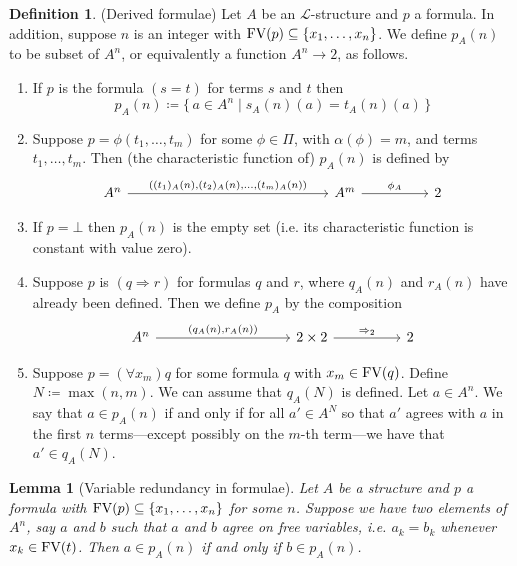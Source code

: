 \documentclass{report}
\theoremstyle{definition}
\theoremstyle{plain}
\newtheorem{lem}[thm]{Lemma}
\theoremstyle{definition}
\newtheorem{defn}[thm]{Definition}
\begin{document}
	\begin{defn}(Derived formulae)
		Let $A$ be an $\mathcal{L}$-structure and $p$ a formula. In addition, suppose $n$ is an integer with $\textnormal{FV}(p) \subseteq \{x_1,\ldots,x_n\}$. We define $p_A(n)$ to be subset of $A^{n}$, or equivalently a function $A^{n} \to 2$, as follows.
		\begin{enumerate}
			\item If $p$ is the formula $(s=t)$ for terms $s$ and $t$ then
			\[
				p_A(n) \coloneqq \{\, a \in A^{n} \mid s_A(n)(a) = t_A(n)(a)\,\}
			\]
			\item Suppose $p = \phi(t_1,\ldots, t_m)$ for some $\phi \in \Pi$, with  $\alpha(\phi) = m$, and terms $t_1,\ldots, t_m$. Then (the characteristic function of) $p_A(n)$ is defined by
			\[\begin{tikzcd}[column sep=huge]
				{A^n} &&& {A^m} & 2
				\arrow["{\phi_A}", from=1-4, to=1-5]
				\arrow["{((t_1)_A(n),(t_2)_A(n),\ldots, (t_m)_A(n))}", from=1-1, to=1-4]
			\end{tikzcd}\]
			\item If $p = \bot$ then $p_A(n)$ is the empty set (i.e. its characteristic function is constant with value zero).
			\item Suppose $p$ is $(q \Rightarrow r)$ for formulas $q$ and $r$, where $q_A(n)$ and $r_A(n)$ have already been defined. Then we define $p_A$ by the composition
			\[\begin{tikzcd}[column sep=huge]
				{A^n} && {2\times 2} & 2
				\arrow["{\Rightarrow_2}", from=1-3, to=1-4]
				\arrow["{(q_A(n),r_A(n))}", from=1-1, to=1-3]
			\end{tikzcd}\]
			\item Suppose $p = (\forall x_m)q$ for some formula $q$ with $x_m \in \textnormal{FV}(q)$. Define $N\coloneqq \max(n,m)$. We can assume that $q_A(N)$ is defined. Let $a\in A^{n}$. We say that $a\in p_A(n)$ if and only if for all $a'\in A^N$ so that $a'$ agrees with $a$ in the first $n$ terms---except possibly on the $m$-th term---we have that $a'\in q_{A}(N)$. 
		\end{enumerate}
	\end{defn}
	\begin{lem}[Variable redundancy in formulae]\label{lem:redun_form}
		Let $A$ be a structure and $p$ a formula with $\textnormal{FV}(p) \subseteq \{x_1,\ldots,x_n\}$ for some $n$. Suppose we have two elements of $A^n$, say $a$ and $b$ such that $a$ and $b$ agree on free variables, i.e. $a_k = b_k$ whenever $x_k\in \textnormal{FV}(t)$. Then $a\in p_A(n)$ if and only if $b\in p_A(n)$.
	\end{lem}
\end{document}
